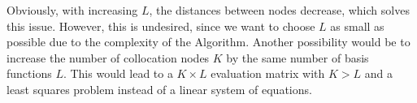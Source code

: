 \documentclass[a4paper,11pt,bibliography=totoc,listof=totoc,headinclude=true,cleardoublepage=empty,oneside]{scrbook}
\begin{document}
Obviously, with increasing $L$, the distances between nodes decrease, which solves this issue. However, this is undesired, since we want to choose $L$ as small as possible due to the complexity of the Algorithm. Another possibility would be to increase the number of collocation nodes $K$ by the same number of basis functions $L$. This would lead to a $K\times L$ evaluation matrix with $K>L$ and a least squares problem instead of a linear system of equations.

\begin{figure}[h]
    
    \centering
\end{figure}
\end{document}
